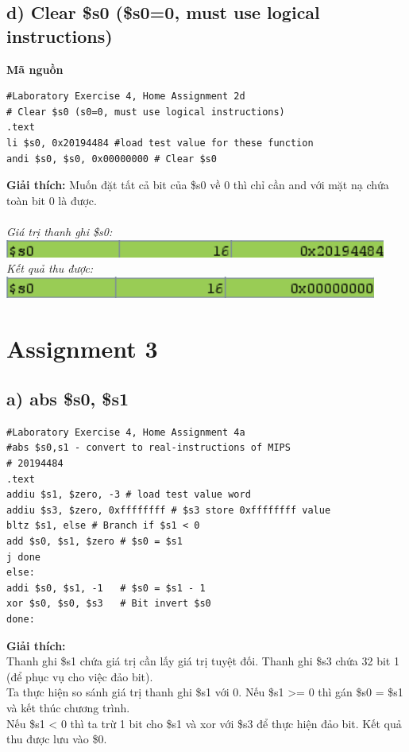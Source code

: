 \documentclass[12pt,a4paper,oneside]{article}
\begin{document}
\subsection*{d) Clear \$s0 (\$s0=0, must use logical instructions)}
\textbf{Mã nguồn}
\begin{lstlisting}
#Laboratory Exercise 4, Home Assignment 2d
# Clear $s0 (s0=0, must use logical instructions)
.text
li $s0, 0x20194484 #load test value for these function
andi $s0, $s0, 0x00000000 # Clear $s0
\end{lstlisting}
\textbf{Giải thích: } Muốn đặt tất cả bit của \$s0 về 0 thì chỉ cần and với mặt nạ chứa toàn bit 0 là được. \\\\
\textit{Giá trị thanh ghi \$s0: \quad \includegraphics[scale=1]{2.0}}\\
\textit{Kết quả thu được: \quad \quad \includegraphics[scale=1]{2.4}}



\pagebreak
\section*{Assignment 3}
	\subsection*{a) abs \$s0, \$s1}
	\begin{center}
	\begin{lstlisting}
#Laboratory Exercise 4, Home Assignment 4a 
#abs $s0,s1 - convert to real-instructions of MIPS	
# 20194484
.text
addiu $s1, $zero, -3 # load test value word
addiu $s3, $zero, 0xffffffff # $s3 store 0xffffffff value
bltz $s1, else # Branch if $s1 < 0
add $s0, $s1, $zero # $s0 = $s1
j done
else:
addi $s0, $s1, -1   # $s0 = $s1 - 1
xor $s0, $s0, $s3   # Bit invert $s0
done:
	\end{lstlisting}
	\end{center}
	\textbf{Giải thích:\\}
	Thanh ghi \$s1 chứa giá trị cần lấy giá trị tuyệt đối. Thanh ghi \$s3 chứa 32 bit 1 (để phục vụ cho việc đảo bit).\\
	Ta thực hiện so sánh giá trị thanh ghi \$s1 với 0. Nếu \$s1 >= 0 thì gán \$s0 = \$s1 và kết thúc chương trình.\\ Nếu \$s1 < 0 thì ta trừ 1 bit cho \$s1 và xor với \$s3 để thực hiện đảo bit. Kết quả thu được lưu vào \$0.
	
\end{document}
